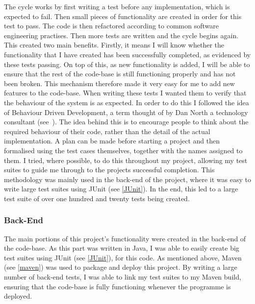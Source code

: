 The cycle works by first writing a test before any implementation, which is expected to fail. Then small pieces of functionality are created in order for this test to pass. The code is then refactored according to common software engineering practises. Then more tests are written and the cycle begins again. This created two main benefits. Firstly, it means I will know whether the functionality that I have created has been successfully completed, as evidenced by these tests passing. On top of this, as new functionality is added, I will be able to ensure that the rest of the code-base is still functioning properly and has not been broken. This mechanism therefore made it very easy for me to add new features to the code-base. When writing these tests I wanted them to verify that the behaviour of the system is as expected. In order to do this I followed the idea of Behaviour Driven Development, a term thought of by Dan North a technology consultant (see~\cite{danNorth}). The idea behind this is to encourage people to think about the required behaviour of their code, rather than the detail of the actual implementation. A plan can be made before starting a project and then formalised using the test cases themselves, together with the names assigned to them. I tried, where possible, to do this throughout my project, allowing my test suites to guide me through to the projects successful completion. This methodology was mainly used in the back-end of the project, where it was easy to write large test suites using JUnit (see \ref{JUnit}). In the end, this led to a large test suite of over one hundred and twenty tests being created. 

\subsubsection{Back-End}
The main portions of this project's functionality were created in the back-end of the code-base. As this part was written in Java, I was able to easily create big test suites using JUnit (see \ref{JUnit}), for this code. As mentioned above, Maven (see \ref{maven}) was used to package and deploy this project. By writing a large number of back-end tests, I was able to link my test suites to my Maven build, ensuring that the code-base is fully functioning whenever the programme is deployed.

